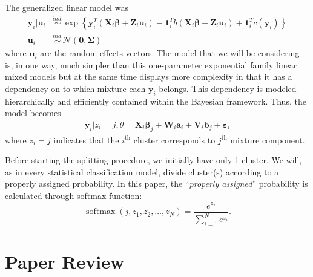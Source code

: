 \documentclass[11pt]{article}
\newcommand{\bs}{\boldsymbol}
\newcommand{\opn}{\operatorname}
\begin{document}
The generalized linear model was
\begin{align*}
  \bs{y}_{i}|\bs{u}_{i} &\overset{ind.}{\sim} \exp \left\{\bs{y}_{i}^{T}\left(\bs{X}_{i}\bs{\beta}+\bs{Z}_{i}\bs{u}_{i} \right) -\bs{1}_{i}^{T} b\left(\bs{X}_{i}\bs{\beta} + \bs{Z}_{i}\bs{u}_{i} \right)+\bs{1}_{i}^{T}c\left(\bs{y}_{i} \right) \right\}\\
  \bs{u}_{i} &\overset{ind.}{\sim} \mathcal{N}\left(\bs{0}, \bs{\Sigma} \right)
\end{align*}
where $\bs{u}_{i}$ are the random effects vectors. The model that we will be considering is, in one way, much simpler than this one-parameter exponential family linear mixed models but at the same time displays more complexity in that it has a dependency on to which mixture each $\bs{y}_{i}$ belongs. This dependency is modeled hierarchically and efficiently contained within the Bayesian framework. Thus, the model becomes
\begin{align*}
  \bs{y}_{i}|z_{i}=j, \theta =\bs{X}_{i}\bs{\beta}_{j} + \bs{W}_{i}\bs{a}_{i} + \bs{V}_{i}\bs{b}_{j} + \bs{\varepsilon}_{i}
\end{align*}
where $z_{i}=j$ indicates that the $i^{\text{th}}$ cluster corresponds to $j^{\text{th}}$ mixture component. \par
Before starting the splitting procedure, we initially have only 1 cluster. We will, as in every statistical classification model, divide cluster(s) according to a properly assigned probability. In this paper, the ``\emph{properly assigned}'' probability is calculated through softmax function:
$$
  \opn{softmax}\left(j, z_{1}, z_{2}, \ldots , z_{N}\right) = \frac{e^{z_{j}}}{\sum_{i=1}^{N}e^{z_{i}}}.
$$

\section{Paper Review}
\end{document}
